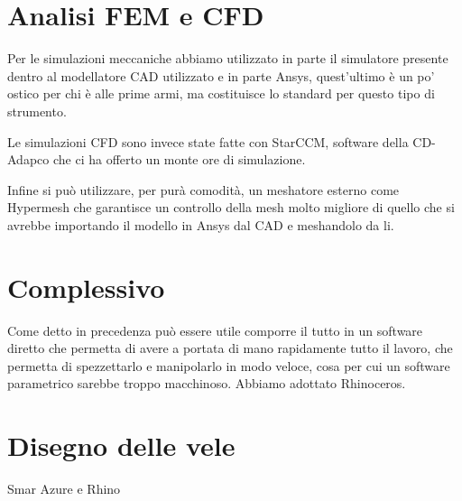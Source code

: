 	\section{Analisi FEM e CFD}
	Per le simulazioni meccaniche abbiamo utilizzato in parte il simulatore presente dentro al modellatore CAD utilizzato e in parte Ansys, quest'ultimo è un po' ostico per chi è alle prime armi, ma costituisce lo standard per questo tipo di strumento.
	
	Le simulazioni CFD sono invece state fatte con StarCCM, software della CD-Adapco che ci ha offerto un monte ore di simulazione.
	
	Infine si può utilizzare, per purà comodità, un meshatore esterno come Hypermesh che garantisce un controllo della mesh molto migliore di quello che si avrebbe importando il modello in Ansys dal CAD e meshandolo da li.
	
	\section{Complessivo}
	Come detto in precedenza può essere utile comporre il tutto in un software diretto che permetta di avere a portata di mano rapidamente tutto il lavoro, che permetta di spezzettarlo e manipolarlo in modo veloce, cosa per cui un software parametrico sarebbe troppo macchinoso. Abbiamo adottato Rhinoceros.
	
	\section{Disegno delle vele}
	Smar Azure e Rhino
